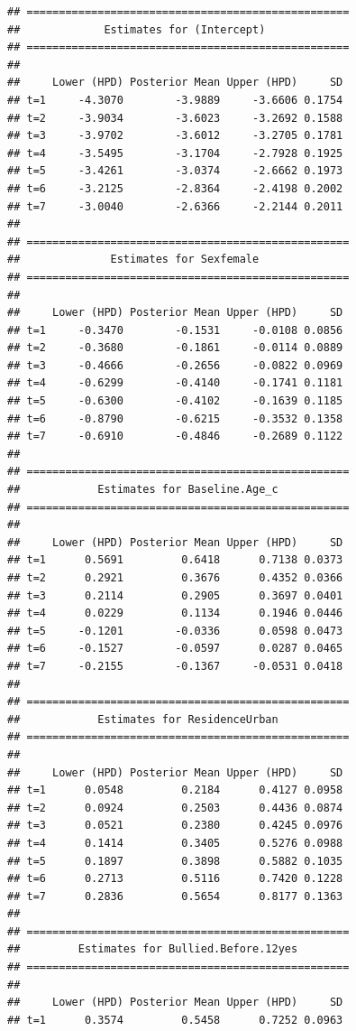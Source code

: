 \documentclass[a4paper, preprint, 3p,
authoryear]{elsarticle} %
\begin{document}
\begin{verbatim}
## ==================================================
##             Estimates for (Intercept)
## ==================================================
## 
##     Lower (HPD) Posterior Mean Upper (HPD)     SD
## t=1     -4.3070        -3.9889     -3.6606 0.1754
## t=2     -3.9034        -3.6023     -3.2692 0.1588
## t=3     -3.9702        -3.6012     -3.2705 0.1781
## t=4     -3.5495        -3.1704     -2.7928 0.1925
## t=5     -3.4261        -3.0374     -2.6662 0.1973
## t=6     -3.2125        -2.8364     -2.4198 0.2002
## t=7     -3.0040        -2.6366     -2.2144 0.2011
## 
## ==================================================
##              Estimates for Sexfemale
## ==================================================
## 
##     Lower (HPD) Posterior Mean Upper (HPD)     SD
## t=1     -0.3470        -0.1531     -0.0108 0.0856
## t=2     -0.3680        -0.1861     -0.0114 0.0889
## t=3     -0.4666        -0.2656     -0.0822 0.0969
## t=4     -0.6299        -0.4140     -0.1741 0.1181
## t=5     -0.6300        -0.4102     -0.1639 0.1185
## t=6     -0.8790        -0.6215     -0.3532 0.1358
## t=7     -0.6910        -0.4846     -0.2689 0.1122
## 
## ==================================================
##            Estimates for Baseline.Age_c
## ==================================================
## 
##     Lower (HPD) Posterior Mean Upper (HPD)     SD
## t=1      0.5691         0.6418      0.7138 0.0373
## t=2      0.2921         0.3676      0.4352 0.0366
## t=3      0.2114         0.2905      0.3697 0.0401
## t=4      0.0229         0.1134      0.1946 0.0446
## t=5     -0.1201        -0.0336      0.0598 0.0473
## t=6     -0.1527        -0.0597      0.0287 0.0465
## t=7     -0.2155        -0.1367     -0.0531 0.0418
## 
## ==================================================
##            Estimates for ResidenceUrban
## ==================================================
## 
##     Lower (HPD) Posterior Mean Upper (HPD)     SD
## t=1      0.0548         0.2184      0.4127 0.0958
## t=2      0.0924         0.2503      0.4436 0.0874
## t=3      0.0521         0.2380      0.4245 0.0976
## t=4      0.1414         0.3405      0.5276 0.0988
## t=5      0.1897         0.3898      0.5882 0.1035
## t=6      0.2713         0.5116      0.7420 0.1228
## t=7      0.2836         0.5654      0.8177 0.1363
## 
## ==================================================
##         Estimates for Bullied.Before.12yes
## ==================================================
## 
##     Lower (HPD) Posterior Mean Upper (HPD)     SD
## t=1      0.3574         0.5458      0.7252 0.0963

\end{verbatim}
\end{document}
